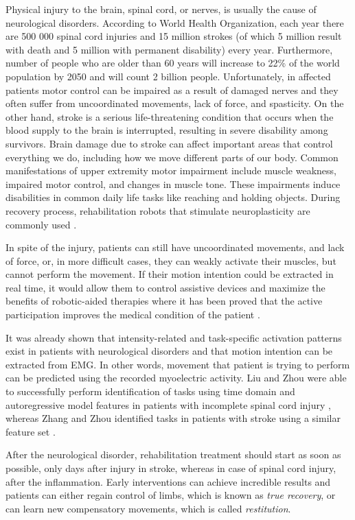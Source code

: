 Physical injury to the brain, spinal cord, or nerves, is usually the cause of neurological disorders. According to World Health Organization, each year there are 500 000 spinal cord injuries and 15 million strokes (of which 5 million result with death and 5 million with permanent disability) every year. Furthermore, number of people who are older than 60 years will increase to 22\% of the world population by 2050 and will count 2 billion people. Unfortunately, in affected patients motor control can be impaired as a result of damaged nerves and they often suffer from uncoordinated movements, lack of force, and spasticity. On the other hand, stroke is a serious life-threatening condition that occurs when the blood supply to the brain is interrupted, resulting in severe disability among survivors. Brain damage due to stroke can affect important areas that control everything we do, including how we move different parts of our body. Common manifestations of upper extremity motor impairment include muscle weakness, impaired motor control, and changes in muscle tone. These impairments induce disabilities in common daily life tasks like reaching and holding objects. During recovery process, rehabilitation robots that stimulate neuroplasticity are commonly used \citep{VacaBenitez2013, Dipietro2005, Marchal-Crespo2009, Cesqui2013}. 

In spite of the injury, patients can still have uncoordinated movements, and lack of force, or, in more difficult cases, they can weakly activate their muscles, but cannot perform the movement. If their motion intention could be extracted in real time, it would allow them to control assistive devices and maximize the benefits of robotic-aided therapies where it has been proved that the active participation improves the medical condition of the patient \citep{Hogan2006}.

It was already shown that intensity-related and task-specific activation patterns exist in patients with neurological disorders and that motion intention can be extracted from EMG. In other words, movement that patient is trying to perform can be predicted using the recorded myoelectric activity. Liu and Zhou were able to successfully perform identification of tasks using time domain and autoregressive model features in patients with incomplete spinal cord injury \citep{Liu2013}, whereas Zhang and Zhou identified tasks in patients with stroke using a similar feature set \citep{Zhang2012}.

After the neurological disorder, rehabilitation treatment should start as soon as possible, only days after injury in stroke, whereas in case of spinal cord injury, after the inflammation. Early interventions can achieve incredible results and patients can either regain control of limbs, which is known as \emph{true recovery}, or can learn new compensatory movements, which is called \emph{restitution}. 

